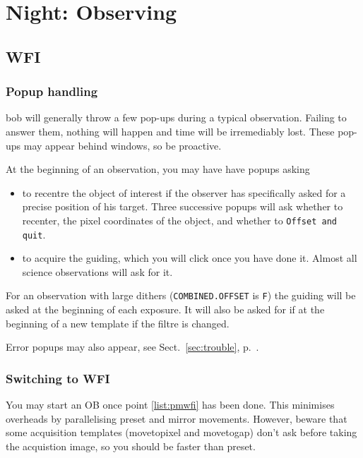 \documentclass[11pt,fleqn]{book}
\def\secref#1{Sect.~\ref{sec:#1}, p.~\pageref{sec:#1}}
\begin{document}

\chapter{Night: Observing}
\label{nightops}

\section{WFI}

\subsection{Popup handling}

\gls{bob} will generally throw a few pop-ups during a typical observation. Failing 
to answer them, nothing will happen and time will be irremediably lost.  These pop-ups may appear behind windows, so be proactive.

At the beginning of an observation, you may have have popups asking
\begin{itemize}
    \item to recentre the object of interest if the observer has specifically
    asked for a precise position of his target.  Three successive popups will
    ask whether to recenter, the pixel coordinates of the object, and whether
    to \texttt{Offset and quit}.
    \item to acquire the guiding, which you will click once you have done it. 
    Almost all science observations will ask  for it.
\end{itemize}

For an observation with large dithers (\texttt{COMBINED.OFFSET} is \texttt{F}) the
guiding will be asked at the beginning of each exposure.  It will also be asked for if at the beginning of a new template if the filtre is changed.

Error popups may also appear, see \secref{trouble}.

\subsection{Switching to WFI}

You may start an OB once point \ref{list:pmwfi} has been done.  This minimises
overheads by parallelising preset and mirror movements.  However, beware that some acquisition templates (movetopixel and movetogap) don't ask before taking the acquistion image, so you should be faster than preset.  
\end{document}
